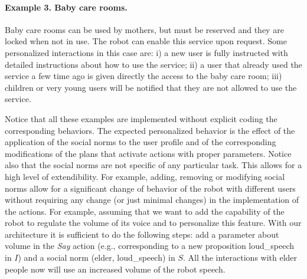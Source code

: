 \paragraph{Example 3. Baby care rooms.} Baby care rooms can be used by mothers, but must be reserved and they are locked when not in use. The robot can enable this service upon request. Some personalized interactions in this case are: i) a new user is fully instructed with detailed instructions about how to use the service; ii) a user that already used the service a few time ago is given directly the access to the baby care room; iii) children or very young users will be notified that they are not allowed to use the service.

Notice that all these examples are implemented without explicit coding the corresponding behaviors. The expected personalized behavior is the effect of the application of the social norms to the user profile and of the corresponding modifications of the plans that activate actions with proper parameters. Notice also that the social norms are not specific of any particular task. This allows for a high level of extendibility. For example, adding, removing or modifying social norms allow for a significant change of behavior of the robot with different users without requiring any change (or just minimal changes) in the implementation of the actions. For example, assuming that we want to add the capability of the robot to regulate the volume of its voice and to personalize this feature. With our architecture it is sufficient to do the following steps: add a parameter about volume in the \emph{Say} action (e.g., corresponding to a new proposition loud\_speech in $I$) and a social norm 
(elder, loud\_speech)  in $S$. All the interactions with elder people now will use an increased volume of the robot speech.

